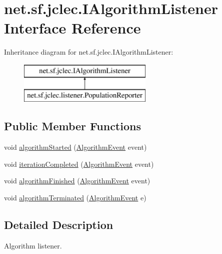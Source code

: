 \hypertarget{interfacenet_1_1sf_1_1jclec_1_1_i_algorithm_listener}{\section{net.\-sf.\-jclec.\-I\-Algorithm\-Listener Interface Reference}
\label{interfacenet_1_1sf_1_1jclec_1_1_i_algorithm_listener}
}
Inheritance diagram for net.\-sf.\-jclec.\-I\-Algorithm\-Listener\-:\begin{figure}[H]
\begin{center}
\leavevmode
\includegraphics[height=2.000000cm]{interfacenet_1_1sf_1_1jclec_1_1_i_algorithm_listener}
\end{center}
\end{figure}
\subsection*{Public Member Functions}
\begin{DoxyCompactItemize}
\item 
void \hyperlink{interfacenet_1_1sf_1_1jclec_1_1_i_algorithm_listener_a32c2170367223947f81b8e56a0296a76}{algorithm\-Started} (\hyperlink{classnet_1_1sf_1_1jclec_1_1_algorithm_event}{Algorithm\-Event} event)
\item 
void \hyperlink{interfacenet_1_1sf_1_1jclec_1_1_i_algorithm_listener_a8f618b1d3650433ae2ad6cd3b96a643a}{iteration\-Completed} (\hyperlink{classnet_1_1sf_1_1jclec_1_1_algorithm_event}{Algorithm\-Event} event)
\item 
void \hyperlink{interfacenet_1_1sf_1_1jclec_1_1_i_algorithm_listener_a272a6bd603ad3cac921eadad48bafdf4}{algorithm\-Finished} (\hyperlink{classnet_1_1sf_1_1jclec_1_1_algorithm_event}{Algorithm\-Event} event)
\item 
void \hyperlink{interfacenet_1_1sf_1_1jclec_1_1_i_algorithm_listener_a478a9ebb4a660c38601a14863242de2b}{algorithm\-Terminated} (\hyperlink{classnet_1_1sf_1_1jclec_1_1_algorithm_event}{Algorithm\-Event} e)
\end{DoxyCompactItemize}


\subsection{Detailed Description}
Algorithm listener.

